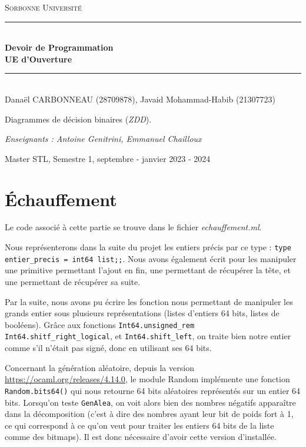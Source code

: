 \documentclass[12pt,a4paper]{article}
\author{Javaid Mohammad-Habib, Carbonneau Danaël}
\begin{document}
\begin{titlepage}
\newcommand{\HRule}{\rule{\linewidth}{0.5mm}}



\center 
\bigskip
\textsc{\LARGE
Sorbonne Université
}
 \\[4cm]
 \HRule \\[0.4cm]
{ \huge \bfseries Devoir de Programmation \\[0.15cm] }
\textbf{UE d'Ouverture}
\HRule \\[0.5cm]

Danaël CARBONNEAU (28709878), Javaid Mohammad-Habib (21307723) \\[2cm]

\begin{huge}
Diagrammes de décision binaires (\textit{ZDD}).
\end{huge}

\vfill

\textit{Enseignants : Antoine Genitrini, Emmanuel Chailloux}

Master STL, Semestre 1, septembre - janvier 2023 - 2024 \\ [1cm]

\end{titlepage}



\tableofcontents



\newpage

\section{Échauffement}

Le code associé à cette partie se trouve dans le fichier \textit{echauffement.ml}. 

Nous représenterons dans la suite du projet les entiers précis par ce type : \texttt{type entier\_precis = int64 list;;}. Nous avons également écrit pour les manipuler une primitive permettant l'ajout en fin, une permettant de récupérer la tête, et une permettant de récupérer sa suite.

Par la suite, nous avons pu écrire les fonction nous permettant de manipuler les grands entier sous plusieurs représentations (listes d'entiers 64 bits, listes de booléens). Grâce aux fonctions \texttt{Int64.unsigned\_rem} \texttt{Int64.shitf\_right\_logical}, et \texttt{Int64.shift\_left}, on traite bien notre entier comme s'il n'était pas signé, donc en utilisant ses 64 bits.

Concernant la génération aléatoire, depuis la version \href{4.14}{https://ocaml.org/releases/4.14.0}, le module Random implémente une fonction \texttt{Random.bits64()} qui nous retourne 64 bits aléatoires représentés sur un entier 64 bits. Lorsqu'on teste \texttt{GenAlea}, on voit alors bien des nombres négatifs apparaître dans la décomposition (c'est à dire des nombres ayant leur bit de poids fort à 1, ce qui correspond à ce qu'on veut pour traiter les entiers 64 bits de la liste comme des bitmaps). Il est donc nécessaire d'avoir cette version d'installée.
\end{document}
